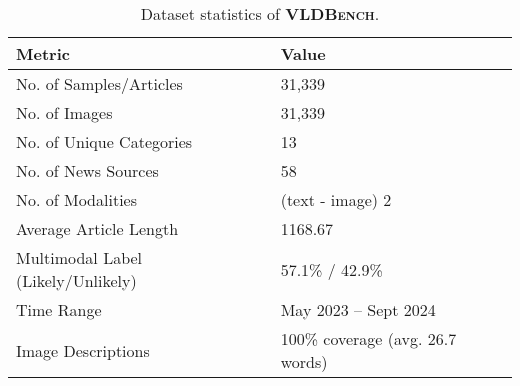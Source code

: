 \begin{table}[ht]
    \centering
    \scriptsize
    \begin{tabular}{|p{3.4cm}|p{3cm}|}
        \hline
        \textbf{Metric} & \textbf{Value} \\ \hline
        No. of Samples/Articles & 31,339 \\
        No. of Images & 31,339 \\
        No. of Unique Categories & 13 \\
        No. of News Sources & 58 \\
        No. of Modalities & (text - image) 2 \\
        Average Article Length & 1168.67 \\ 
        Multimodal Label (Likely/Unlikely) & 57.1\% / 42.9\% \\
        Time Range & May 2023 -- Sept 2024 \\
        Image Descriptions & 100\% coverage (avg. 26.7 words) \\
        \hline
    \end{tabular}
    \caption{Dataset statistics of \textsf{\textbf{\textsc{VLDBench}}}.}
    \label{tab:dataset_statistics}
\end{table}